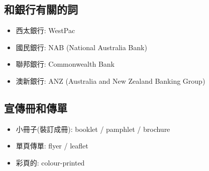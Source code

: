 \subsection{和銀行有關的詞}
\begin{itemize}
  \itemsep0em
  \item 西太銀行: WestPac
  \item 國民銀行: NAB (National Australia Bank)
  \item 聯邦銀行: Commonwealth Bank
  \item 澳新銀行: ANZ (Australia and New Zealand Banking Group)
\end{itemize}

\subsection{宣傳冊和傳單}
\begin{itemize}
  \itemsep0em
  \item 小冊子(裝訂成冊): booklet / pamphlet / brochure
  \item 單頁傳單: flyer / leaflet
  \item 彩頁的: colour-printed
\end{itemize}

